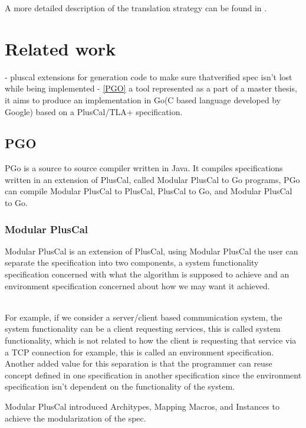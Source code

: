 \documentclass{thesul}
\begin{document}
A more detailed description of the translation strategy can be found in \cite{pcalAlgo}.

\chapter{Related work}

- pluscal extensions for generation code to make sure thatverified spec isn't lost while being implemented
- \ref{PGO} a tool represented as a part of a master thesis, it aims to produce an implementation in Go(C based language developed by Google) based on a PlusCal/TLA+ specification.

\section{PGO}

PGo is a source to source compiler written in Java. It compiles specifications written in an extension of PlusCal, called Modular PlusCal to Go programs, PGo can compile Modular PlusCal to PlusCal, PlusCal to Go, and Modular PlusCal to Go.

\subsection{Modular PlusCal}

Modular PlusCal is an extension of PlusCal, using Modular PlusCal the user can separate the specification into two components, a system functionality specification concerned with what the algorithm is supposed to achieve and an environment specification concerned about how we may want it achieved.

\hfill\\

For example, if we consider a server/client based communication system, the system functionality can be a client requesting services, this is called system functionality, which is not related to how the client is requesting that service via a TCP connection for example, this is called an environment specification. Another added value for this separation is that the programmer can reuse concept defined in one specification in another specification since the environment specification isn't dependent on the functionality of the system.

Modular PlusCal introduced Architypes, Mapping Macros, and Instances to achieve the modularization of the spec.
\end{document}
